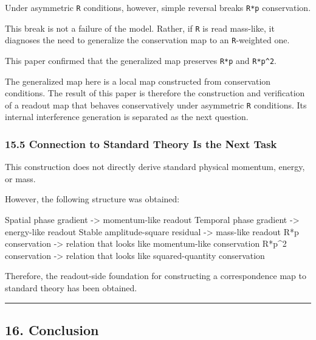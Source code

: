 \documentclass[
  a4paper,
]{article}
\newenvironment{Shaded}{}{}
\newcommand{\NormalTok}[1]{#1}
\begin{document}
Under asymmetric \texttt{R} conditions, however, simple reversal breaks
\texttt{R*p} conservation.

This break is not a failure of the model. Rather, if \texttt{R} is read
mass-like, it diagnoses the need to generalize the conservation map to
an \texttt{R}-weighted one.

This paper confirmed that the generalized map preserves \texttt{R*p} and
\texttt{R*p\^{}2}.

The generalized map here is a local map constructed from conservation
conditions. The result of this paper is therefore the construction and
verification of a readout map that behaves conservatively under
asymmetric \texttt{R} conditions. Its internal interference generation
is separated as the next question.

\subsubsection{15.5 Connection to Standard Theory Is the Next
Task}\label{connection-to-standard-theory-is-the-next-task}

This construction does not directly derive standard physical momentum,
energy, or mass.

However, the following structure was obtained:

\begin{Shaded}
\begin{Highlighting}[]
\NormalTok{Spatial phase gradient {-}\textgreater{} momentum{-}like readout}
\NormalTok{Temporal phase gradient {-}\textgreater{} energy{-}like readout}
\NormalTok{Stable amplitude{-}square residual {-}\textgreater{} mass{-}like readout}
\NormalTok{R*p conservation {-}\textgreater{} relation that looks like momentum{-}like conservation}
\NormalTok{R*p\^{}2 conservation {-}\textgreater{} relation that looks like squared{-}quantity conservation}
\end{Highlighting}
\end{Shaded}

Therefore, the readout-side foundation for constructing a correspondence
map to standard theory has been obtained.

\begin{center}\rule{0.5\linewidth}{0.5pt}\end{center}

\subsection{16. Conclusion}\label{conclusion}
\end{document}
